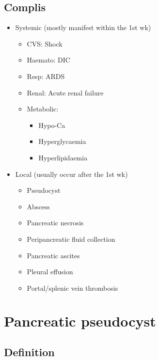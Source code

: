\documentclass[
  12pt,
]{memoir}
\providecommand{\tightlist}{%
  \setlength{\itemsep}{0pt}\setlength{\parskip}{0pt}}
\begin{document}
\hypertarget{complis}{%
\subsection{Complis}\label{complis}}

\begin{itemize}
\tightlist
\item
  Systemic (mostly manifest within the 1st wk)

  \begin{itemize}
  \tightlist
  \item
    CVS: Shock
  \item
    Haemato: DIC
  \item
    Resp: ARDS
  \item
    Renal: Acute renal failure
  \item
    Metabolic:

    \begin{itemize}
    \tightlist
    \item
      Hypo-Ca
    \item
      Hyperglycaemia
    \item
      Hyperlipidaemia
    \end{itemize}
  \end{itemize}
\item
  Local (usually occur after the 1st wk)

  \begin{itemize}
  \tightlist
  \item
    Pseudocyst
  \item
    Abscess
  \item
    Pancreatic necrosis
  \item
    Peripancreatic fluid collection
  \item
    Pancreatic ascites
  \item
    Pleural effusion
  \item
    Portal/splenic vein thrombosis
  \end{itemize}
\end{itemize}

\hypertarget{pancreatic-pseudocyst}{%
\section{Pancreatic pseudocyst}\label{pancreatic-pseudocyst}}

\hypertarget{definition-1}{%
\subsection{Definition}\label{definition-1}}
\end{document}
